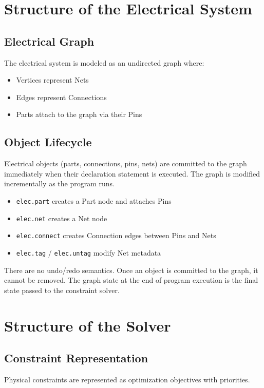 \chapter{Structure of the Electrical System}

\section{Electrical Graph}
The electrical system is modeled as an undirected graph where:
\begin{itemize}
\item Vertices represent Nets
\item Edges represent Connections
\item Parts attach to the graph via their Pins
\end{itemize}

\section{Object Lifecycle}
Electrical objects (parts, connections, pins, nets) are committed to the graph immediately when their declaration statement is executed. The graph is modified incrementally as the program runs.

\begin{itemize}
\item \texttt{elec.part} creates a Part node and attaches Pins
\item \texttt{elec.net} creates a Net node
\item \texttt{elec.connect} creates Connection edges between Pins and Nets
\item \texttt{elec.tag} / \texttt{elec.untag} modify Net metadata
\end{itemize}

There are no undo/redo semantics. Once an object is committed to the graph, it cannot be removed. The graph state at the end of program execution is the final state passed to the constraint solver.


\chapter{Structure of the Solver}

\section{Constraint Representation}
Physical constraints are represented as optimization objectives with priorities.

